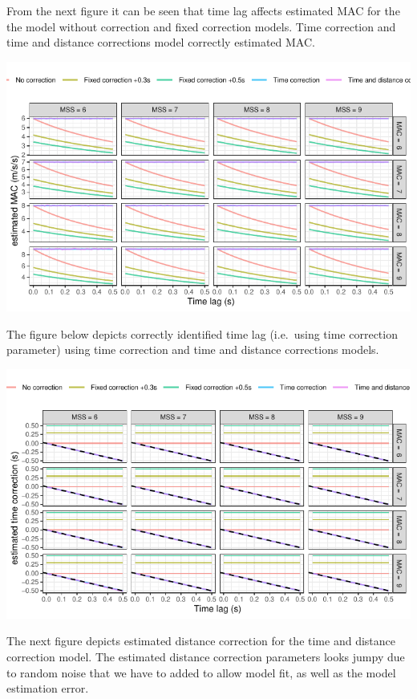 \documentclass[fleqn,10pt,lineno]{wlpeerj} %
\begin{document}
From the next figure it can be seen that time lag affects estimated MAC for the the model without correction and fixed correction models. Time correction and time and distance corrections model correctly estimated MAC.

\begin{center}\includegraphics[width=0.9\linewidth]{paper_files/figure-latex/unnamed-chunk-45-1} \end{center}

The figure below depicts correctly identified time lag (i.e.~using time correction parameter) using time correction and time and distance corrections models.

\begin{center}\includegraphics[width=0.9\linewidth]{paper_files/figure-latex/unnamed-chunk-46-1} \end{center}

The next figure depicts estimated distance correction for the time and distance correction model. The estimated distance correction parameters looks jumpy due to random noise that we have to added to allow model fit, as well as the model estimation error.
\end{document}

